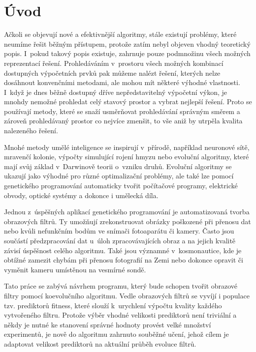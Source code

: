
\chapter{Úvod}

Ačkoli se objevují nové a efektivnější algoritmy, stále existují problémy, které neumíme řešit běžným  přístupem, protože zatím nebyl objeven vhodný teoretický popis. I~pokud takový popis existuje, zahrnuje pouze podmnožinu všech možných reprezentací řešení. Prohledáváním v~prostoru všech možných kombinací dostupných výpočetních prvků pak můžeme nalézt řešení, kterých nelze dosáhnout konvenčními metodami, ale mohou mít některé výhodné vlastnosti. I~když je dnes běžně dostupný dříve nepředstavitelný výpočetní výkon, je mnohdy nemožné prohledat celý stavový prostor a vybrat nejlepší řešení. Proto se používají metody, které se snaží usměrňovat prohledávání správným směrem a zároveň prohledávaný prostor co nejvíce zmenšit, to vše aniž by utrpěla kvalita nalezeného řešení.

Mnohé metody umělé inteligence se inspirují v~přírodě, například neuronové sítě, mravenčí kolonie, výpočty simulující rojení hmyzu nebo evoluční algoritmy, které mají svůj základ v~Darwinově teorii o~vzniku druhů. Evoluční algoritmy se ukazují jako výhodné pro různé optimalizační problémy, ale také lze pomocí genetického programování automaticky tvořit počítačové programy, elektrické obvody, optické systémy a dokonce i umělecká díla.

Jednou z~úspěšných aplikací genetického programování je automatizovaná tvorba obrazových filtrů. Ty umožňují zrekonstruovat obrázky poškozené při přenosu dat nebo kvůli nefunkčním bodům ve snímači fotoaparátu či kamery. Často jsou součástí předzpracování dat u~úloh zpracovávajících obraz a na jejich kvalitě závisí úspěšnost celého algoritmu. Také jsou významné v~kosmonautice, kde je obtížné zamezit chybám při přenosu fotografií na Zemi nebo dokonce opravit či vyměnit kameru umístěnou na vesmírné sondě.

Tato práce se zabývá návrhem programu, který bude schopen tvořit obrazové filtry pomocí koevolučního algoritmu. Vedle obrazových filtrů se vyvíjí i populace tzv. prediktorů fitness, které slouží k~urychlení výpočtu kvality každého vytvořeného filtru. Protože výběr vhodné velikosti prediktorů není triviální a někdy je nutné ke stanovení správné hodnoty provést velké množství experimentů, je nově do algoritmu zahrnuto souběžné učení, jehož cílem je adaptovat velikost prediktorů na aktuální průběh evoluce filtrů.

